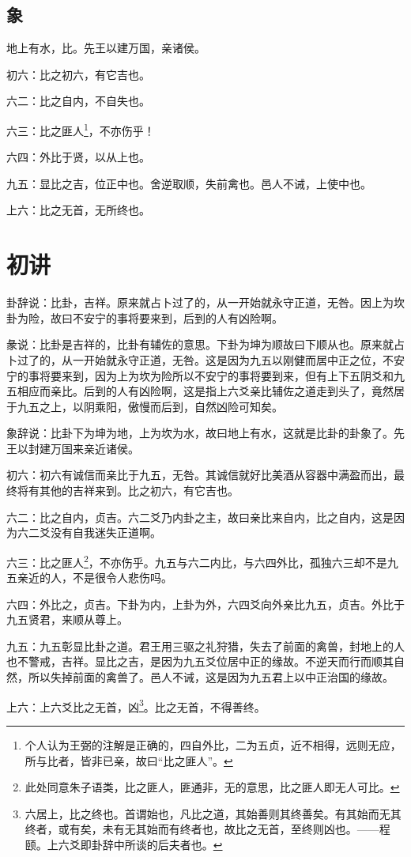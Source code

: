 \documentclass[12pt,oneside]{book}
\begin{document}
\subsection{象}
地上有水，比。先王以建万国，亲诸侯。

初六：比之初六，有它吉也。

六二：比之自内，不自失也。

六三：比之匪人\footnote{个人认为王弼的注解是正确的，四自外比，二为五贞，近不相得，远则无应，所与比者，皆非已亲，故曰“比之匪人”。}，不亦伤乎！

六四：外比于贤，以从上也。

九五：显比之吉，位正中也。舍逆取顺，失前禽也。邑人不诫，上使中也。

上六：比之无首，无所终也。

\section{初讲}
卦辞说：比卦，吉祥。原来就占卜过了的，从一开始就永守正道，无咎。因上为坎卦为险，故曰不安宁的事将要来到，后到的人有凶险啊。

彖说：比卦是吉祥的，比卦有辅佐的意思。下卦为坤为顺故曰下顺从也。原来就占卜过了的，从一开始就永守正道，无咎。这是因为九五以刚健而居中正之位，不安宁的事将要来到，因为上为坎为险所以不安宁的事将要到来，但有上下五阴爻和九五相应而亲比。后到的人有凶险啊，这是指上六爻亲比辅佐之道走到头了，竟然居于九五之上，以阴乘阳，傲慢而后到，自然凶险可知矣。

象辞说：比卦下为坤为地，上为坎为水，故曰地上有水，这就是比卦的卦象了。先王以封建万国来亲近诸侯。

初六：初六有诚信而亲比于九五，无咎。其诚信就好比美酒从容器中满盈而出，最终将有其他的吉祥来到。比之初六，有它吉也。

六二：比之自内，贞吉。六二爻乃内卦之主，故曰亲比来自内，比之自内，这是因为六二爻没有自我迷失正道啊。

六三：比之匪人\footnote{此处同意朱子语类，比之匪人，匪通非，无的意思，比之匪人即无人可比。}，不亦伤乎。九五与六二内比，与六四外比，孤独六三却不是九五亲近的人，不是很令人悲伤吗。

六四：外比之，贞吉。下卦为内，上卦为外，六四爻向外亲比九五，贞吉。外比于九五贤君，来顺从尊上。

九五：九五彰显比卦之道。君王用三驱之礼狩猎，失去了前面的禽兽，封地上的人也不警戒，吉祥。显比之吉，是因为九五爻位居中正的缘故。不逆天而行而顺其自然，所以失掉前面的禽兽了。邑人不诫，这是因为九五君上以中正治国的缘故。

上六：上六爻比之无首，凶\footnote{六居上，比之终也。首谓始也，凡比之道，其始善则其终善矣。有其始而无其终者，或有矣，未有无其始而有终者也，故比之无首，至终则凶也。——程颐。上六爻即卦辞中所谈的后夫者也。}。比之无首，不得善终。
\end{document}
